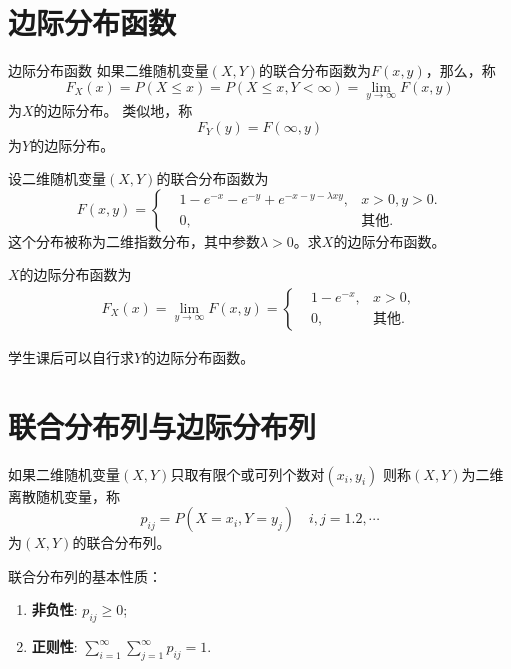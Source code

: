 \section{边际分布函数}
\begin{definition}{边际分布函数}\label{def:m.c.d.f}
    如果二维随机变量$(X,Y)$的联合分布函数为$F(x,y)$，那么，称
    $$F_X(x) = P(X\leq x) = P(X\leq x, Y< \infty) = \lim_{y\rightarrow \infty} F(x,y)$$
    为$X$的边际分布。
    类似地，称
    $$
    F_Y(y) = F(\infty,y)
    $$
    为$Y$的边际分布。
\end{definition}
\begin{example}
设二维随机变量$(X,Y)$的联合分布函数为
$$
F(x,y) = \left\{
\begin{aligned}
    &1-e^{-x} - e^{-y} + e^{-x-y-\lambda xy}, &x>0,y>0.\\
    &0, &\text{其他}.
\end{aligned}
\right.
$$
这个分布被称为二维指数分布，其中参数$\lambda>0$。求$X$的边际分布函数。
\end{example}
\begin{solution}
$X$的边际分布函数为
\begin{eqnarray*}
    F_{X}(x) = \lim_{y\rightarrow\infty} F(x,y) = \left\{
    \begin{aligned}
        & 1 - e^{-x}, & x>0,\\
        & 0 , & \text{其他}.
    \end{aligned}
    \right.
\end{eqnarray*}
\end{solution}
\begin{note}
学生课后可以自行求$Y$的边际分布函数。
    \vspace{3cm}
\end{note}


\section{联合分布列与边际分布列}
\begin{definition}
如果二维随机变量$(X,Y)$只取有限个或可列个数对$\left(x_{i}, y_{i}\right)$
则称$(X,Y)$为二维离散随机变量，称
$$p_{i j}=P\left(X=x_{i}, Y=y_{j}\right) \quad i, j=1.2, \cdots$$
为$(X,Y)$的联合分布列。
\end{definition}

\begin{property}
联合分布列的基本性质：
\begin{enumerate}
    \item \textbf{非负性}: $p_{ij}\geq 0$;
    \item \textbf{正则性}: $\sum_{i=1}^{\infty}\sum_{j=1}^{\infty} p_{ij} = 1$.
\end{enumerate}
\end{property}

